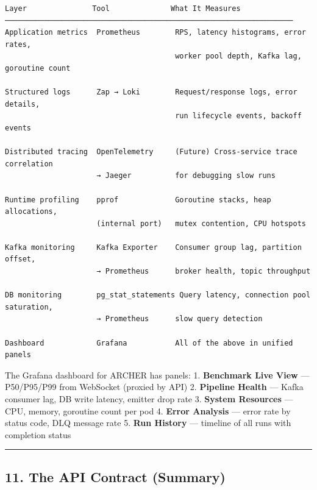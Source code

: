 \documentclass[
]{article}
\begin{document}
\begin{verbatim}
Layer               Tool              What It Measures
──────────────────────────────────────────────────────────────────
Application metrics  Prometheus        RPS, latency histograms, error rates,
                                       worker pool depth, Kafka lag, goroutine count

Structured logs      Zap → Loki        Request/response logs, error details,
                                       run lifecycle events, backoff events

Distributed tracing  OpenTelemetry     (Future) Cross-service trace correlation
                     → Jaeger          for debugging slow runs

Runtime profiling    pprof             Goroutine stacks, heap allocations,
                     (internal port)   mutex contention, CPU hotspots

Kafka monitoring     Kafka Exporter    Consumer group lag, partition offset,
                     → Prometheus      broker health, topic throughput

DB monitoring        pg_stat_statements Query latency, connection pool saturation,
                     → Prometheus      slow query detection

Dashboard            Grafana           All of the above in unified panels
\end{verbatim}

The Grafana dashboard for ARCHER has panels: 1. \textbf{Benchmark Live
View} --- P50/P95/P99 from WebSocket (proxied by API) 2.
\textbf{Pipeline Health} --- Kafka consumer lag, DB write latency,
emitter drop rate 3. \textbf{System Resources} --- CPU, memory,
goroutine count per pod 4. \textbf{Error Analysis} --- error rate by
status code, DLQ message rate 5. \textbf{Run History} --- timeline of
all runs with completion status

\begin{center}\rule{0.5\linewidth}{0.5pt}\end{center}

\hypertarget{the-api-contract-summary}{%
\subsection{11. The API Contract
(Summary)}\label{the-api-contract-summary}}
\end{document}
